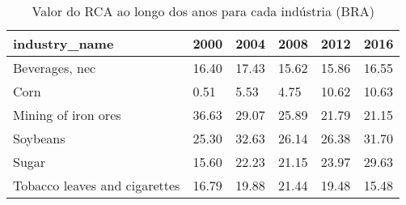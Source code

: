 \begin{table}
\centering
\caption{Valor do RCA ao longo dos anos para cada indústria (BRA)}
\begin{tabular}{p{6cm}p{1.5cm}p{1.5cm}p{1.5cm}p{1.5cm}p{1.5cm}}
\toprule
                industry\_name &  2000 &  2004 &  2008 &  2012 &  2016 \\
\midrule
               Beverages, nec & 16.40 & 17.43 & 15.62 & 15.86 & 16.55 \\
                         Corn &  0.51 &  5.53 &  4.75 & 10.62 & 10.63 \\
          Mining of iron ores & 36.63 & 29.07 & 25.89 & 21.79 & 21.15 \\
                     Soybeans & 25.30 & 32.63 & 26.14 & 26.38 & 31.70 \\
                        Sugar & 15.60 & 22.23 & 21.15 & 23.97 & 29.63 \\
Tobacco leaves and cigarettes & 16.79 & 19.88 & 21.44 & 19.48 & 15.48 \\
\bottomrule
\end{tabular}
\end{table}
